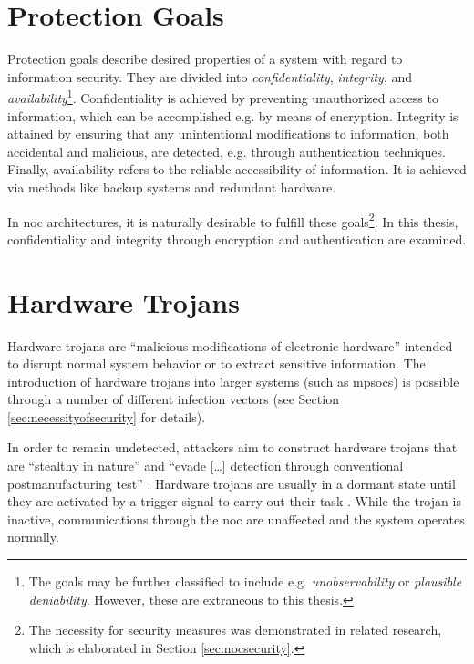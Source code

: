 \section{Protection Goals}\label{sec:protectiongoals}
Protection goals describe desired properties of a system with regard to information security. They are divided into \textit{confidentiality},
\textit{integrity}, and \textit{availability}\footnote{The goals may be further classified to include e.g. \textit{unobservability} or \textit{plausible
deniability}. However, these are extraneous to this thesis.}. Confidentiality is achieved by preventing unauthorized access to information, which
can be accomplished e.g. by means of encryption. Integrity is attained by ensuring that any unintentional modifications to information, both accidental and
malicious, are detected, e.g. through authentication techniques. Finally, availability refers to the reliable accessibility of information. It is
achieved via methods like backup systems and redundant hardware.

In \gls{noc} architectures, it is naturally desirable to fulfill these goals\footnote{The necessity for security measures was demonstrated in
related research, which is elaborated in Section \ref{sec:nocsecurity}.}. In this thesis, confidentiality and integrity through encryption and
authentication are examined.

\section{Hardware Trojans}\label{sec:hardwaretrojans}
Hardware trojans are \enquote{malicious modifications of electronic hardware} \cite[1]{bhunia14hardwaretrojans} intended to disrupt normal
system behavior or to extract sensitive information. The introduction of hardware trojans into larger systems (such as \glspl{mpsoc}) is possible
through a number of different infection vectors (see Section \ref{sec:necessityofsecurity} for details).

In order to remain undetected, attackers aim to construct hardware trojans that are \enquote{stealthy in nature} \cite[1]{bhunia14hardwaretrojans}
and \enquote{evade […] detection through conventional postmanufacturing test} \cite[1]{bhunia14hardwaretrojans}. Hardware trojans are usually in a
dormant state until they are activated by a trigger signal to carry out their task \cites{bhunia14hardwaretrojans}{ancajas14fortnocs}. While the
trojan is inactive, communications through the \gls{noc} are unaffected and the system operates normally.

